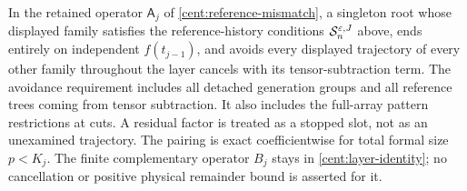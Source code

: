 \begin{proposition}\label{cent:cancellation}
In the retained operator $\mathsf A_j$ of
\eqref{cent:reference-mismatch}, a singleton root
whose displayed family satisfies the reference-history conditions
$\mathcal S_n^{\varepsilon,J}$ above, ends entirely on independent
$f(t_{j-1})$, and avoids every displayed trajectory of every other
family throughout the layer cancels with its tensor-subtraction
term. The avoidance requirement includes all detached generation
groups and all reference trees coming from tensor subtraction.
It also includes the full-array pattern restrictions at cuts.
A residual factor is treated as a stopped slot, not as an unexamined
trajectory. The pairing is exact coefficientwise for total formal
size $p<K_j$. The finite complementary operator $B_j$ stays in
\eqref{cent:layer-identity}; no cancellation or positive physical
remainder bound is asserted for it.
\end{proposition}
